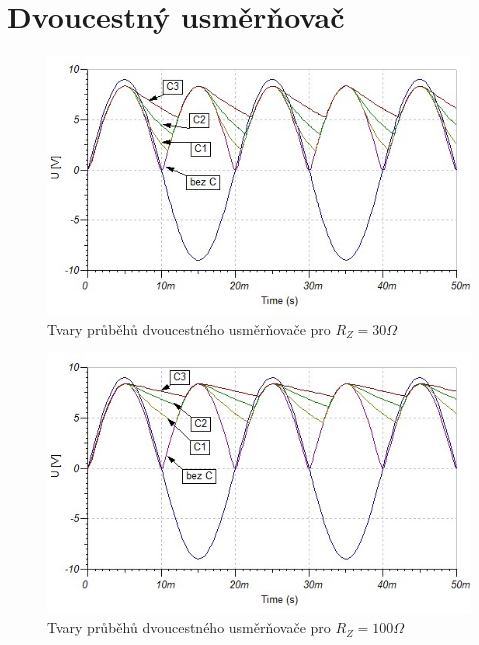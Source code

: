 \documentclass[12pt]{article} %
\begin{document}
\section{Dvoucestný usměrňovač}
\begin{figure}[H]
\center
\includegraphics[scale=0.7]{dvoucestny30.jpg}
\caption{Tvary průběhů dvoucestného usměrňovače pro $R_Z = 30\Omega$}
\end{figure}

\begin{figure}[H]
\center
\includegraphics[scale=0.7]{dvoucestny100.jpg}
\caption{Tvary průběhů dvoucestného usměrňovače pro $R_Z = 100\Omega$}
\end{figure}
\end{document}
